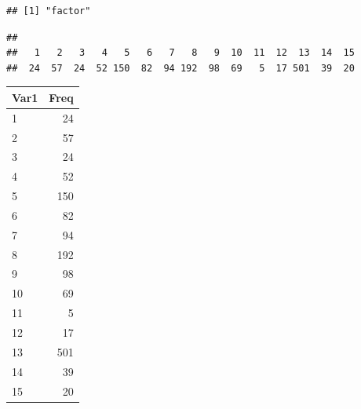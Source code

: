 \documentclass[
]{article}
\newenvironment{Shaded}{\begin{snugshade}}{\end{snugshade}}
\newcommand{\FunctionTok}[1]{\textcolor[rgb]{0.00,0.00,0.00}{#1}}
\newcommand{\NormalTok}[1]{#1}
\newcommand{\SpecialCharTok}[1]{\textcolor[rgb]{0.00,0.00,0.00}{#1}}
\begin{document}
\begin{Shaded}
\end{Shaded}

\begin{verbatim}
## [1] "factor"
\end{verbatim}

\begin{Shaded}
\end{Shaded}

\begin{verbatim}
## 
##   1   2   3   4   5   6   7   8   9  10  11  12  13  14  15 
##  24  57  24  52 150  82  94 192  98  69   5  17 501  39  20
\end{verbatim}

\begin{Shaded}
\end{Shaded}

\begin{longtable}[]{@{}lr@{}}
\toprule
Var1 & Freq \\
\midrule
\endhead
1 & 24 \\
2 & 57 \\
3 & 24 \\
4 & 52 \\
5 & 150 \\
6 & 82 \\
7 & 94 \\
8 & 192 \\
9 & 98 \\
10 & 69 \\
11 & 5 \\
12 & 17 \\
13 & 501 \\
14 & 39 \\
15 & 20 \\
\bottomrule
\end{longtable}

\begin{Shaded}
\end{Shaded}
\end{document}

